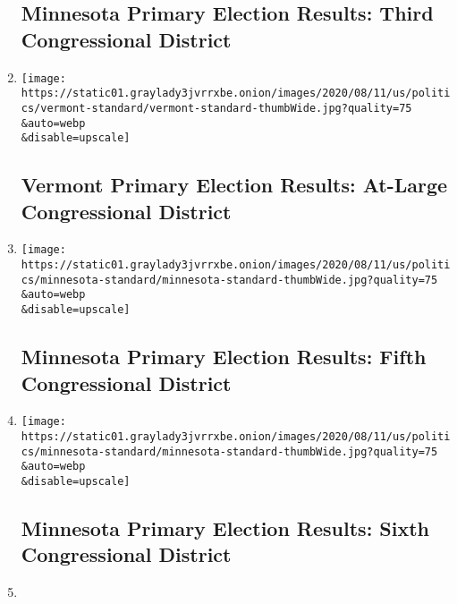 \begin{enumerate}
  \hypertarget{minnesota-primary-election-results-third-congressional-district}{%
  \subsection{Minnesota Primary Election Results: Third Congressional
  District}\label{minnesota-primary-election-results-third-congressional-district}}
\item
  \href{/interactive/2020/08/11/us/elections/results-vermont-house-district-at-large-primary-election.html}{}

  \texttt{[image: https://static01.graylady3jvrrxbe.onion/images/2020/08/11/us/politics/vermont-standard/vermont-standard-thumbWide.jpg?quality=75\\\&auto=webp\\\&disable=upscale]}

  \hypertarget{vermont-primary-election-results-at-large-congressional-district}{%
  \subsection{Vermont Primary Election Results: At-Large Congressional
  District}\label{vermont-primary-election-results-at-large-congressional-district}}
\item
  \href{/interactive/2020/08/11/us/elections/results-minnesota-house-district-5-primary-election.html}{}

  \texttt{[image: https://static01.graylady3jvrrxbe.onion/images/2020/08/11/us/politics/minnesota-standard/minnesota-standard-thumbWide.jpg?quality=75\\\&auto=webp\\\&disable=upscale]}

  \hypertarget{minnesota-primary-election-results-fifth-congressional-district}{%
  \subsection{Minnesota Primary Election Results: Fifth Congressional
  District}\label{minnesota-primary-election-results-fifth-congressional-district}}
\item
  \href{/interactive/2020/08/11/us/elections/results-minnesota-house-district-6-primary-election.html}{}

  \texttt{[image: https://static01.graylady3jvrrxbe.onion/images/2020/08/11/us/politics/minnesota-standard/minnesota-standard-thumbWide.jpg?quality=75\\\&auto=webp\\\&disable=upscale]}

  \hypertarget{minnesota-primary-election-results-sixth-congressional-district}{%
  \subsection{Minnesota Primary Election Results: Sixth Congressional
  District}\label{minnesota-primary-election-results-sixth-congressional-district}}
\item
  \href{/interactive/2020/08/11/us/elections/results-minnesota-senate-primary-election.html}{}


\end{enumerate}
